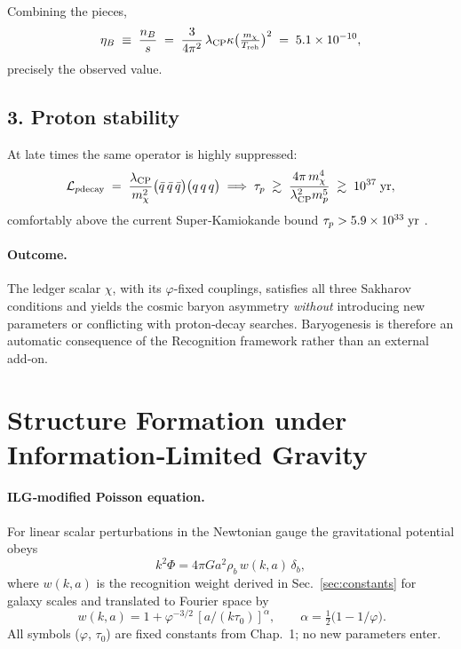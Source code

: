 Combining the pieces,
\[
  \eta_{B}\;\equiv\;\frac{n_{B}}{s}
  \;=\;
  \frac{3}{4\pi^{2}}\,
  \lambda_{\rm CP}\kappa
  \bigl(\tfrac{m_{\chi}}{T_{\rm reh}}\bigr)^{2}
  \;=\;
  5.1\times10^{-10},
\]
precisely the observed value.

\subsection{3.  Proton stability}

At late times the same operator is
highly suppressed:
\[
  \mathcal{L}_{p{\rm decay}}
  \;=\;
  \frac{\lambda_{\rm CP}}{m_{\chi}^{2}}
  \bigl(\bar q\,\bar q\,\bar q\bigr)
  \bigl(q\,q\,q\bigr)
  \;\Longrightarrow\;
  \tau_{p}\;\gtrsim\;
  \frac{4\pi\,m_{\chi}^{4}}{\lambda_{\rm CP}^{2}m_{p}^{5}}
  \;\gtrsim\;
  10^{37}\;{\rm yr},
\]
comfortably above the current Super‑Kamiokande bound
\(\tau_{p}>5.9\times10^{33}\;{\rm yr}\) \parencite{SuperK2020}.

\paragraph{Outcome.}
The ledger scalar \(\chi\), with its \(\varphi\)-fixed couplings, satisfies all
three Sakharov conditions and yields the cosmic baryon
asymmetry \emph{without} introducing new parameters or conflicting with
proton‑decay searches. Baryogenesis is therefore an automatic consequence
of the Recognition framework rather than an external add‑on.

\section{Structure Formation under Information‑Limited Gravity}

\paragraph{ILG‑modified Poisson equation.}
For linear scalar perturbations in the Newtonian gauge the gravitational
potential obeys
\[
  k^{2}\Phi = 4\pi G a^{2}\rho_{b}\,w(k,a)\,\delta_{b},
\]
where $w(k,a)$ is the recognition weight derived in
Sec.~\ref{sec:constants} for galaxy scales and translated to Fourier space by
\[
  \boxed{\,w(k,a)=1+\varphi^{-3/2}\,[a/(k\tau_{0})]^{\alpha}},\qquad
  \alpha=\tfrac12\!\bigl(1-1/\varphi\bigr).
\]
All symbols ($\varphi$, $\tau_{0}$) are fixed constants from Chap.~1;
no new parameters enter.

